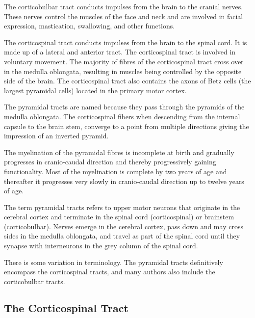 The corticobulbar tract conducts impulses from the brain to the cranial nerves. These nerves control the muscles of the face and neck and are involved in facial expression, mastication, swallowing, and other functions.

The corticospinal tract conducts impulses from the brain to the spinal cord. It is made up of a lateral and anterior tract. The corticospinal tract is involved in voluntary movement. The majority of fibres of the corticospinal tract cross over in the medulla oblongata, resulting in muscles being controlled by the opposite side of the brain. The corticospinal tract also contains the axons of Betz cells (the largest pyramidal cells) located in the primary motor cortex.

The pyramidal tracts are named because they pass through the pyramids of the medulla oblongata. The corticospinal fibers when descending from the internal capsule to the brain stem, converge to a point from multiple directions giving the impression of an inverted pyramid.

The myelination of the pyramidal fibres is incomplete at birth and gradually progresses in cranio-caudal direction and thereby progressively gaining functionality. Most of the myelination is complete by two years of age and thereafter it progresses very slowly in cranio-caudal direction up to twelve years of age.

The term pyramidal tracts refers to upper motor neurons that originate in the cerebral cortex and terminate in the spinal cord (corticospinal) or brainstem (corticobulbar). Nerves emerge in the cerebral cortex, pass down and may cross sides in the medulla oblongata, and travel as part of the spinal cord until they synapse with interneurons in the grey column of the spinal cord.

There is some variation in terminology. The pyramidal tracts definitively encompass the corticospinal tracts, and many authors also include the corticobulbar tracts.

\hypertarget{the-corticospinal-tract}{%
\subsection{The Corticospinal Tract}\label{the-corticospinal-tract}}

